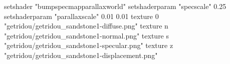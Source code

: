 setshader "bumpspecmapparallaxworld"
setshaderparam "specscale" 0.25
setshaderparam "parallaxscale" 0.01 0.01
texture 0 "getridou/getridou_sandstone1-diffuse.png"
texture n "getridou/getridou_sandstone1-normal.png"
texture s "getridou/getridou_sandstone1-specular.png"
texture z "getridou/getridou_sandstone1-displacement.png"